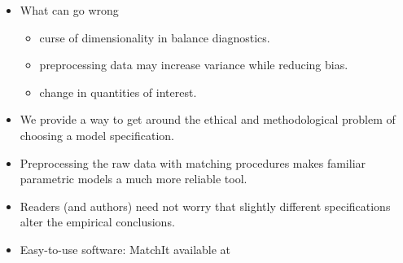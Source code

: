 \documentclass[20pt,landscape,pdftex]{foils}
\begin{document}
\begin{itemize}
\item What can go wrong\pause
  \begin{itemize}
  \item curse of dimensionality in balance diagnostics.\pause
  \item preprocessing data may increase variance while reducing
    bias.\pause 
  \item change in quantities of interest.\pause
  \end{itemize}
\item We provide a way to get around the ethical and methodological
  problem of choosing a model specification.\pause

\item Preprocessing the raw data with matching procedures makes
  familiar parametric models a much more reliable tool.\pause
  
\item Readers (and authors) need not worry that slightly different
  specifications alter the empirical conclusions.\pause

\item Easy-to-use software: MatchIt available at
  \pause

\end{itemize}



\hypersetup{pdfpagetransition=Replace}



\hypersetup{pdfpagetransition=Replace}
\end{document}
